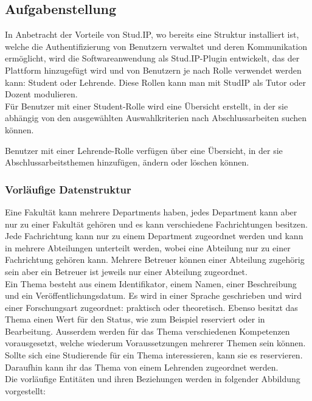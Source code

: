 \subsection{Aufgabenstellung}
In Anbetracht der Vorteile von Stud.IP, wo bereits eine Struktur installiert ist, welche die Authentifizierung von Benutzern verwaltet und deren Kommunikation ermöglicht, wird die Softwareanwendung als Stud.IP-Plugin entwickelt, das der Plattform hinzugefügt wird und von Benutzern je nach Rolle verwendet werden kann: Student oder Lehrende. Diese Rollen kann man mit StudIP als Tutor oder Dozent modulieren.\\

Für Benutzer mit einer Student-Rolle wird eine Übersicht erstellt, in der sie abhängig von den ausgewählten Auswahlkriterien nach Abschlussarbeiten suchen können.

Benutzer mit einer Lehrende-Rolle verfügen über eine Übersicht, in der sie Abschlussarbeitsthemen hinzufügen, ändern oder löschen können.

\subsubsection{Vorläufige Datenstruktur}
Eine Fakultät kann mehrere Departments haben, jedes Department kann aber nur zu einer Fakultät gehören und es kann verschiedene Fachrichtungen besitzen.
Jede Fachrichtung kann nur zu einem Department zugeordnet werden und kann in mehrere Abteilungen unterteilt werden, wobei eine Abteilung nur zu einer Fachrichtung gehören kann.
Mehrere Betreuer können einer Abteilung zugehörig sein aber ein Betreuer ist jeweils nur einer Abteilung zugeordnet.\\

Ein Thema besteht aus einem Identifikator, einem Namen, einer Beschreibung und ein Veröffentlichungsdatum. Es wird in einer Sprache geschrieben und wird einer Forschungsart zugeordnet: praktisch oder theoretisch. Ebenso besitzt das Thema einen Wert für den Status, wie zum Beispiel reserviert oder in Bearbeitung. Au{ss}erdem werden für das Thema verschiedenen Kompetenzen vorausgesetzt, welche wiederum Voraussetzungen mehrerer Themen sein können.\\
Sollte sich eine Studierende für ein Thema interessieren, kann sie es reservieren. Daraufhin kann ihr das Thema von einem Lehrenden zugeordnet werden.\\

Die vorläufige Entitäten und ihren Beziehungen werden in folgender Abbildung vorgestellt:\\



